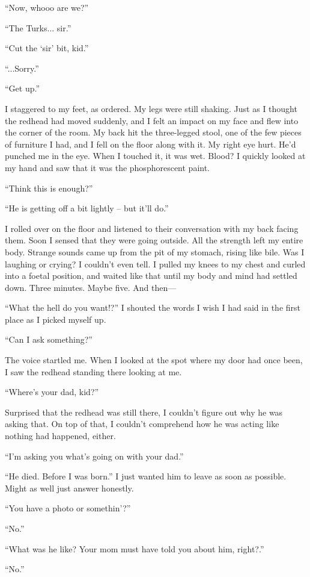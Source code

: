 \documentclass[oneside]{book}
\begin{document}
“Now, whooo are we?”

“The Turks... sir.”

“Cut the ‘sir’ bit, kid.”

“...Sorry.”

“Get up.”

I staggered to my feet, as ordered. My legs were still shaking. Just as I thought the redhead had moved suddenly, and I felt an impact on my face and flew into the corner of the room. My back hit the three-legged stool, one of the few pieces of furniture I had, and I fell on the floor along with it. My right eye hurt. He’d punched me in the eye. When I touched it, it was wet. Blood? I quickly looked at my hand and saw that it was the phosphorescent paint.

“Think this is enough?”

“He is getting off a bit lightly – but it’ll do.”

I rolled over on the floor and listened to their conversation with my back facing them. Soon I sensed that they were going outside. All the strength left my entire body. Strange sounds came up from the pit of my stomach, rising like bile. Was I laughing or crying? I couldn’t even tell. I pulled my knees to my chest and curled into a foetal position, and waited like that until my body and mind had settled down. Three minutes. Maybe five. And then—

“What the hell do you want!?” I shouted the words I wish I had said in the first place as I picked myself up.

“Can I ask something?”

The voice startled me. When I looked at the spot where my door had once been, I saw the redhead standing there looking at me.

“Where’s your dad, kid?”

Surprised that the redhead was still there, I couldn’t figure out why he was asking that. On top of that, I couldn’t comprehend how he was acting like nothing had happened, either.

“I’m asking you what’s going on with your dad.”

“He died. Before I was born.” I just wanted him to leave as soon as possible. Might as well just answer honestly.

“You have a photo or somethin’?”

“No.”

“What was he like? Your mom must have told you about him, right?.”

“No.”
\end{document}
